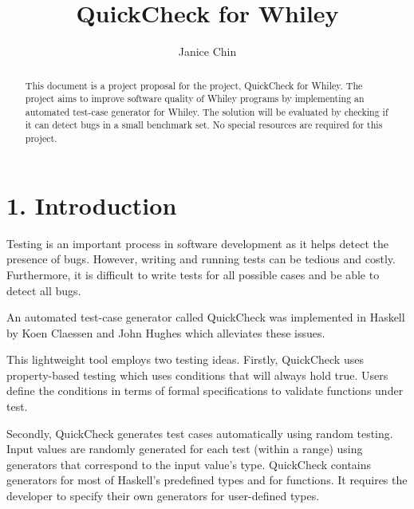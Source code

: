 \documentclass[11pt, a4paper, twoside, openright]{report}
\title{QuickCheck for Whiley}
\author{Janice Chin}
\date{}
\begin{document}
\frontmatter


\begin{abstract}
   This document is a project proposal for the project, QuickCheck for Whiley. 
   The project aims to improve software quality of Whiley programs by  implementing an automated test-case generator for Whiley.
   The solution will be evaluated by checking if it can detect bugs in a small benchmark set. No special resources are required for this project.
\end{abstract}


\maketitle




\mainmatter


\section*{1. Introduction}
Testing is an important process in software development as it helps detect the presence of bugs.
However, writing and running tests can be tedious and costly. Furthermore, it is difficult to write tests for all possible cases and be able to detect all bugs.

An automated test-case generator called QuickCheck was implemented in Haskell by Koen Claessen and John Hughes which alleviates these issues.

This lightweight tool employs two testing ideas.
Firstly, QuickCheck uses property-based testing which uses conditions that will always hold true. Users define the conditions in terms of formal specifications to validate functions under test.

Secondly, QuickCheck generates test cases automatically using random testing. Input values are randomly generated for each test (within a range) using generators that correspond to the input value's type. QuickCheck contains generators for most of Haskell's predefined types and for functions. It requires the developer to specify their own generators for user-defined types. 
\end{document}

